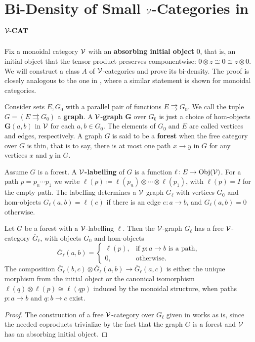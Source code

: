 
\appendix
\section{Bi-Density of Small \texorpdfstring{$\mathcal{V}$}{V}-Categories in \texorpdfstring{$\mathcal{V}\text{-}\mathbf{CAT}$}{V-CAT}}

Fix a monoidal category $\mathcal{V}$ with an \textbf{absorbing initial object} $0$, that is, an initial object that the tensor product preserves componentwise: $0\otimes z\cong 0\cong z\otimes 0$. We will construct a class $A$ of $\mathcal{V}$-categories and prove its bi-density. The proof is closely analogous to the one in \cite[Lemma~7.1]{hofstraInnerAutoequivalencesGeneral2024}, where a similar statement is shown for monoidal categories.

\begin{definition}
    Consider sets $E,G_0$ with a parallel pair of functions $E\rightrightarrows G_0$. We call the tuple $G = (E\rightrightarrows G_0)$ a \textbf{graph}. A $\mathcal{V}$-\textbf{graph} $\textbf{G}$ over $G_0$ is just a choice of hom-objects $\textbf{G}(a,b)$ in $\mathcal{V}$ for each $a,b\in G_0$. The elements of $G_0$ and $E$ are called vertices and edges, respectively. A graph $G$ is said to be a \textbf{forest} when the free category over $G$ is thin, that is to say, there is at most one path $x\to y$ in $G$ for any vertices $x$ and $y$ in $G$.
\end{definition}

\begin{definition}
    Assume $G$ is a forest. A \textbf{$\mathcal{V}$-labelling} of $G$ is a function $\ell\colon E\to\mathrm{Obj}(\mathcal{V})$. For a path $p=p_n\cdots p_1$ we write $\ell(p)\coloneqq\ell(p_n)\otimes\cdots\otimes\ell(p_1)$, with $\ell(p)=I$ for the empty path. The labelling determines a $\mathcal{V}$-graph $G_\ell$ with vertices $G_0$ and hom-objects $G_\ell(a,b)=\ell(e)$ if there is an edge $e\colon a\to b$, and $G_\ell(a,b)=0$ otherwise.
\end{definition}

\begin{lemma}\label{lem:freeForest}
Let $G$ be a forest with a $\mathcal{V}$-labelling $\ell$. Then the $\mathcal{V}$-graph $G_\ell$ has a free $\mathcal{V}$-category $\overline{G}_\ell$, with objects $G_0$ and hom-objects
$$
\overline{G}_\ell(a,b)=\begin{cases}\ell(p), & \text{if } p\colon a\to b \text{ is a path},\\ 0, & \text{otherwise}.\end{cases}
$$
The composition $\overline{G}_\ell(b,c)\otimes \overline{G}_\ell(a,b)\to \overline{G}_\ell(a,c)$ is either the unique morphism from the initial object or the canonical isomorphism $\ell(q)\otimes \ell(p)\cong \ell(qp)$ induced by the monoidal structure, when paths $p\colon a\to b$ and $q\colon b\to c$ exist.
\end{lemma}
\begin{proof}
The construction of a free $\mathcal{V}$-category over $G_\ell$ given in \cite{wolffVcatVgraph1974} works as is, since the needed coproducts trivialize by the fact that the graph $G$ is a forest and $\mathcal{V}$ has an absorbing initial object.
\end{proof}

